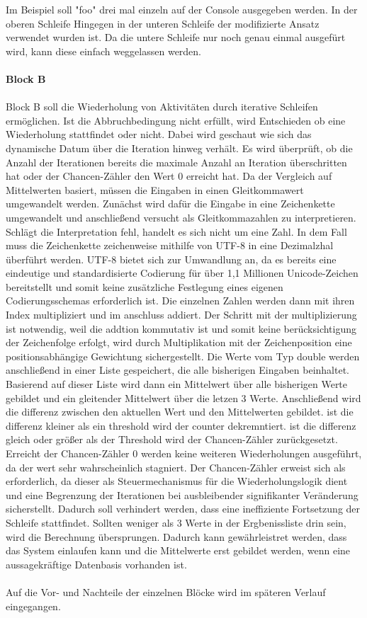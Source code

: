 \documentclass{article}
\begin{document}
    Im Beispiel soll "foo" drei mal einzeln auf der Console ausgegeben werden. 
    In der oberen Schleife
    Hingegen in der unteren Schleife der modifizierte Ansatz verwendet wurden ist. Da die untere Schleife nur noch genau einmal ausgefürt wird, kann diese einfach weggelassen werden.\\
    \\
    \textbf{Block B}\\
    \\
    Block B soll die Wiederholung von Aktivitäten durch iterative Schleifen ermöglichen.
    Ist die Abbruchbedingung nicht erfüllt, wird Entschieden ob eine Wiederholung stattfindet oder nicht. Dabei wird geschaut wie sich das dynamische Datum über die Iteration hinweg verhält.
    Es wird überprüft, ob die Anzahl der Iterationen bereits die maximale Anzahl an Iteration überschritten hat oder der Chancen-Zähler den Wert 0 erreicht hat.
    Da der Vergleich auf Mittelwerten basiert, müssen die Eingaben in einen Gleitkommawert umgewandelt werden.
    Zunächst wird dafür die Eingabe in eine Zeichenkette umgewandelt und anschließend versucht als Gleitkommazahlen zu interpretieren. 
    Schlägt die Interpretation fehl, handelt es sich nicht um eine Zahl. In dem Fall muss die Zeichenkette zeichenweise mithilfe von UTF-8 in eine Dezimalzhal überführt werden.     
    UTF-8 bietet sich zur Umwandlung an, da es bereits eine eindeutige und standardisierte Codierung für über 1,1 Millionen Unicode-Zeichen bereitstellt und somit keine zusätzliche Festlegung eines eigenen Codierungsschemas erforderlich ist.    
    Die einzelnen Zahlen werden dann mit ihren Index multipliziert und im anschluss addiert.
    Der Schritt mit der multiplizierung ist notwendig, weil die addtion kommutativ ist und somit keine berücksichtigung der Zeichenfolge erfolgt, wird durch Multiplikation mit der Zeichenposition eine positionsabhängige Gewichtung sichergestellt.
    Die Werte vom Typ double werden anschließend in einer Liste gespeichert, die alle bisherigen Eingaben beinhaltet.
    Basierend auf dieser Liste wird dann ein Mittelwert über alle bisherigen Werte gebildet und ein gleitender Mittelwert über die letzen 3 Werte.
    Anschließend wird die differenz zwischen den aktuellen Wert und den Mittelwerten gebildet. ist die differenz kleiner als ein threshold wird der counter dekremntiert. ist die differenz gleich oder größer als der Threshold wird der Chancen-Zähler zurückgesetzt.
    Erreicht der Chancen-Zähler 0 werden keine weiteren Wiederholungen ausgeführt, da der wert sehr wahrscheinlich stagniert.
    Der Chancen-Zähler erweist sich als erforderlich, da dieser als Steuermechanismus für die Wiederholungslogik dient und eine Begrenzung der Iterationen bei ausbleibender signifikanter Veränderung sicherstellt.
    Dadurch soll verhindert werden, dass eine ineffiziente Fortsetzung der Schleife stattfindet.
    Sollten weniger als 3 Werte in der Ergbenissliste drin sein, wird die Berechnung übersprungen. Dadurch kann gewährleistret werden, dass das System einlaufen kann und die Mittelwerte erst gebildet werden, wenn eine aussagekräftige Datenbasis vorhanden ist.\\
    \\
    Auf die Vor- und Nachteile der einzelnen Blöcke wird im späteren Verlauf eingegangen.
\end{document}
